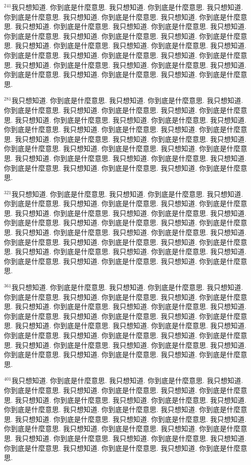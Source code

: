 \documentclass{book}
\begin{document}
$^{241}$我只想知道.
你到底是什麼意思.
我只想知道.
你到底是什麼意思.
我只想知道.
你到底是什麼意思.
我只想知道.
你到底是什麼意思.
我只想知道.
你到底是什麼意思.
我只想知道.
你到底是什麼意思.
我只想知道.
你到底是什麼意思.
我只想知道.
你到底是什麼意思.
我只想知道.
你到底是什麼意思.
我只想知道.
你到底是什麼意思.
我只想知道.
你到底是什麼意思.
我只想知道.
你到底是什麼意思.
我只想知道.
你到底是什麼意思.
我只想知道.
你到底是什麼意思.
我只想知道.
你到底是什麼意思.
我只想知道.
你到底是什麼意思.
我只想知道.
你到底是什麼意思.
我只想知道.
你到底是什麼意思.
我只想知道.
你到底是什麼意思.
我只想知道.
你到底是什麼意思.

$^{281}$我只想知道.
你到底是什麼意思.
我只想知道.
你到底是什麼意思.
我只想知道.
你到底是什麼意思.
我只想知道.
你到底是什麼意思.
我只想知道.
你到底是什麼意思.
我只想知道.
你到底是什麼意思.
我只想知道.
你到底是什麼意思.
我只想知道.
你到底是什麼意思.
我只想知道.
你到底是什麼意思.
我只想知道.
你到底是什麼意思.
我只想知道.
你到底是什麼意思.
我只想知道.
你到底是什麼意思.
我只想知道.
你到底是什麼意思.
我只想知道.
你到底是什麼意思.
我只想知道.
你到底是什麼意思.
我只想知道.
你到底是什麼意思.
我只想知道.
你到底是什麼意思.
我只想知道.
你到底是什麼意思.
我只想知道.
你到底是什麼意思.
我只想知道.
你到底是什麼意思.

$^{321}$我只想知道.
你到底是什麼意思.
我只想知道.
你到底是什麼意思.
我只想知道.
你到底是什麼意思.
我只想知道.
你到底是什麼意思.
我只想知道.
你到底是什麼意思.
我只想知道.
你到底是什麼意思.
我只想知道.
你到底是什麼意思.
我只想知道.
你到底是什麼意思.
我只想知道.
你到底是什麼意思.
我只想知道.
你到底是什麼意思.
我只想知道.
你到底是什麼意思.
我只想知道.
你到底是什麼意思.
我只想知道.
你到底是什麼意思.
我只想知道.
你到底是什麼意思.
我只想知道.
你到底是什麼意思.
我只想知道.
你到底是什麼意思.
我只想知道.
你到底是什麼意思.
我只想知道.
你到底是什麼意思.
我只想知道.
你到底是什麼意思.
我只想知道.
你到底是什麼意思.

$^{361}$我只想知道.
你到底是什麼意思.
我只想知道.
你到底是什麼意思.
我只想知道.
你到底是什麼意思.
我只想知道.
你到底是什麼意思.
我只想知道.
你到底是什麼意思.
我只想知道.
你到底是什麼意思.
我只想知道.
你到底是什麼意思.
我只想知道.
你到底是什麼意思.
我只想知道.
你到底是什麼意思.
我只想知道.
你到底是什麼意思.
我只想知道.
你到底是什麼意思.
我只想知道.
你到底是什麼意思.
我只想知道.
你到底是什麼意思.
我只想知道.
你到底是什麼意思.
我只想知道.
你到底是什麼意思.
我只想知道.
你到底是什麼意思.
我只想知道.
你到底是什麼意思.
我只想知道.
你到底是什麼意思.
我只想知道.
你到底是什麼意思.
我只想知道.
你到底是什麼意思.

$^{401}$我只想知道.
你到底是什麼意思.
我只想知道.
你到底是什麼意思.
我只想知道.
你到底是什麼意思.
我只想知道.
你到底是什麼意思.
我只想知道.
你到底是什麼意思.
我只想知道.
你到底是什麼意思.
我只想知道.
你到底是什麼意思.
我只想知道.
你到底是什麼意思.
我只想知道.
你到底是什麼意思.
我只想知道.
你到底是什麼意思.
我只想知道.
你到底是什麼意思.
我只想知道.
你到底是什麼意思.
我只想知道.
你到底是什麼意思.
我只想知道.
你到底是什麼意思.
我只想知道.
你到底是什麼意思.
我只想知道.
你到底是什麼意思.
我只想知道.
你到底是什麼意思.
我只想知道.
你到底是什麼意思.
我只想知道.
你到底是什麼意思.
我只想知道.
你到底是什麼意思.
\end{document}
